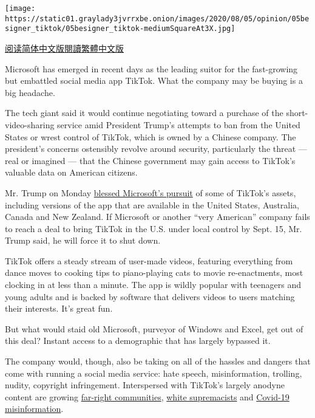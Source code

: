 \texttt{[image: https://static01.graylady3jvrrxbe.onion/images/2020/08/05/opinion/05besigner\_tiktok/05besigner\_tiktok-mediumSquareAt3X.jpg]}

\href{https://cn.nytimes3xbfgragh.onion/opinion/20200805/tiktok-microsoft-trump/}{阅读简体中文版}\href{https://cn.nytimes3xbfgragh.onion/opinion/20200805/tiktok-microsoft-trump/zh-hant/}{閱讀繁體中文版}

Microsoft has emerged in recent days as the leading suitor for the
fast-growing but embattled social media app TikTok. What the company may
be buying is a big headache.

The tech giant said it would continue negotiating toward a purchase of
the short-video-sharing service amid President Trump's attempts to ban
from the United States or wrest control of TikTok, which is owned by a
Chinese company. The president's concerns ostensibly revolve around
security, particularly the threat --- real or imagined --- that the
Chinese government may gain access to TikTok's valuable data on American
citizens.

Mr. Trump on Monday
\href{https://www.nytimes3xbfgragh.onion/2020/08/03/technology/trump-tiktok-microsoft.html}{blessed
Microsoft's pursuit} of some of TikTok's assets, including versions of
the app that are available in the United States, Australia, Canada and
New Zealand. If Microsoft or another ``very American'' company fails to
reach a deal to bring TikTok in the U.S. under local control by Sept.
15, Mr. Trump said, he will force it to shut down.

TikTok offers a steady stream of user-made videos, featuring everything
from dance moves to cooking tips to piano-playing cats to movie
re-enactments, most clocking in at less than a minute. The app is wildly
popular with teenagers and young adults and is backed by software that
delivers videos to users matching their interests. It's great fun.

But what would staid old Microsoft, purveyor of Windows and Excel, get
out of this deal? Instant access to a demographic that has largely
bypassed it.

The company would, though, also be taking on all of the hassles and
dangers that come with running a social media service: hate speech,
misinformation, trolling, nudity, copyright infringement. Interspersed
with TikTok's largely anodyne content are growing
\href{https://www.huffpost.com/entry/far-right-tiktok-gen-z_n_5cb63040e4b082aab08da0d3}{far-right
communities},
\href{https://www.vice.com/en_us/article/yw74gy/tiktok-neo-nazis-white-supremacy}{white
supremacists} and
\href{https://www.rollingstone.com/culture/culture-features/tiktok-conspiracy-theories-bill-gates-microchip-vaccine-996394/}{Covid-19
misinformation}.

